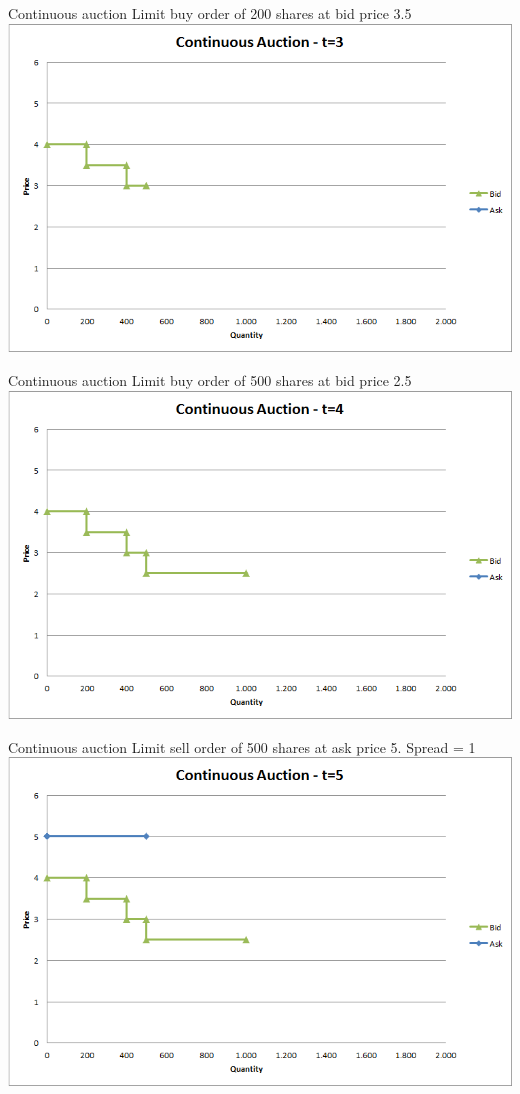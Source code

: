 \documentclass[english,10pt]{beamer}
\theoremstyle{definition}
\begin{document}
\begin{frame}{Continuous auction}
	Limit buy order of 200 shares at bid price 3.5
	\quad
	\center
	\includegraphics[width=.75\linewidth]{pics/Continuous_t3}
\end{frame}


\begin{frame}{Continuous auction}
	Limit buy order of 500 shares at bid price 2.5
	\quad
	\center
	\includegraphics[width=.75\linewidth]{pics/Continuous_t4}
\end{frame}


\begin{frame}{Continuous auction}
	Limit sell order of 500 shares at ask price 5. Spread =  1
	\quad
	\center
	\includegraphics[width=.75\linewidth]{pics/Continuous_t5}
\end{frame}
\end{document}
